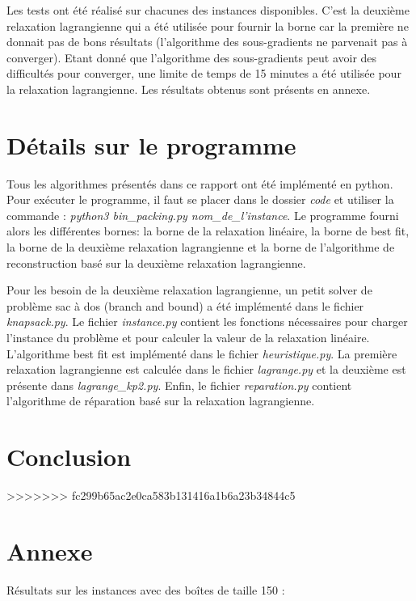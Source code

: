 \documentclass{article}
\begin{document}
Les tests ont été réalisé sur chacunes des instances disponibles.
C'est la deuxième relaxation lagrangienne qui a été utilisée pour fournir la borne car la première ne donnait pas de bons résultats (l'algorithme des sous-gradients ne parvenait pas à converger).
Etant donné que l'algorithme des sous-gradients peut avoir des difficultés pour converger, une limite de temps de 15 minutes a été utilisée pour la relaxation lagrangienne.
Les résultats obtenus sont présents en annexe.

\section{Détails sur le programme}

Tous les algorithmes présentés dans ce rapport ont été implémenté en python.
Pour exécuter le programme, il faut se placer dans le dossier \textit{code} et utiliser la commande : \textit{python3 bin\_packing.py nom\_de\_l'instance}.
Le programme fourni alors les différentes bornes: la borne de la relaxation linéaire, la borne de best fit, la borne de la deuxième relaxation lagrangienne et la borne de l'algorithme de reconstruction basé sur la deuxième relaxation lagrangienne.\newline

Pour les besoin de la deuxième relaxation lagrangienne, un petit solver de problème sac à dos (branch and bound) a été implémenté dans le fichier \textit{knapsack.py}.
Le fichier \textit{instance.py} contient les fonctions nécessaires pour charger l'instance du problème et pour calculer la valeur de la relaxation linéaire.
L'algorithme best fit est implémenté dans le fichier \textit{heuristique.py}.
La première relaxation lagrangienne est calculée dans le fichier \textit{lagrange.py} et la deuxième est présente dans \textit{lagrange\_kp2.py}.
Enfin, le fichier \textit{reparation.py} contient l'algorithme de réparation basé sur la relaxation lagrangienne.

\section{Conclusion}
>>>>>>> fc299b65ac2e0ca583b131416a1b6a23b34844c5

\section{Annexe}

Résultats sur les instances avec des boîtes de taille 150 :\\
\end{document}
